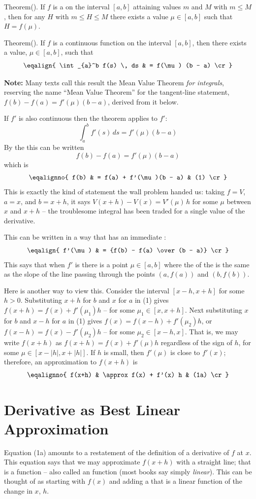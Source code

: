 \proclaim Theorem(). If $f$ is a  on the interval $[a, b]$ attaining values
$m$ and $M$ with $m \le M$, then for any  $H$ with $m \le H \le M$ 
there exists a value $\mu \in [a,b]$ such that $H = f(\mu)$.

\proclaim Theorem(). If $f$ is a continuous function on the interval $[a,b]$,
then there exists a value, $\mu \in [a,b]$, such that
$$
\eqalign{
\int_{a}^b f(s) \, ds & = f(\mu) (b - a) \cr
}
$$

{\bf Note:\/} Many texts call this result the Mean Value Theorem {\it for
integrals\/}, reserving the name ``Mean Value Theorem'' for the tangent-line
statement, $f(b) - f(a) = f'(\mu)(b - a)$, derived from it below.

If $f'$ is also continuous then the theorem applies to $f'$:
$$
\int_a^b f'(s) \, ds = f'(\mu) (b - a)
$$
By the  this can be written
$$
f(b) - f(a) = f'(\mu)(b - a)
$$
which is
$$
\eqalignno{
f(b) & = f(a) + f'(\mu)(b - a) & (1) \cr
}
$$
This is exactly the kind of statement the wall problem handed us: taking
$f = V$, $a = x$, and $b = x + h$, it says
$V(x+h) - V(x) = V'(\mu)\, h$ for some $\mu$ between $x$ and $x+h$ -- the
troublesome integral has been traded for a single value of the derivative.

This can be written in a way that has an immediate :
$$
\eqalign{
f'(\mu) & = {f(b) - f(a) \over (b - a)}  \cr
}
$$
This says that when $f'$ is  there is a point $\mu \in [a,b]$ where the  of the 
 is the same as the slope 
of the line passing through the points $(a, f(a))$ and $(b, f(b))$.

Here is another way to view this. Consider the interval $[x-h, x+h]$ for some $h>0$.  Substituting $x+h$ for $b$ and $x$ for $a$ in (1) gives
$f(x+h) = f(x) + f'(\mu_1)h$ -- for some $\mu_1 \in [x, x+h]$. Next substituting $x$ for $b$ and $x-h$ for $a$ in (1) gives
$f(x) = f(x-h) + f'(\mu_2) h$, or $f(x-h) = f(x) - f'(\mu_2)h$ -- for some $\mu_2 \in [x-h,x]$. That is, we may write $f(x+h)$ as
$f(x+h) = f(x) + f'(\mu)h$ regardless of the sign of $h$, for some $\mu \in [x-|h|, x+|h|]$.
If $h$ is small, then $f'(\mu)$ is close to $f'(x)$; therefore, an approximation to $f(x+h)$ is
$$
\eqalignno{
f(x+h) & \approx f(x) + f'(x) h & (1a) \cr
}
$$

\section{Derivative as Best Linear Approximation}
Equation (1a) amounts to a restatement of the definition of a derivative of $f$ at $x$.
This equation says that we may approximate $f(x+h)$ with a straight line; that is
a {\it {}\/} function -- also called an {\it {}\/} function
(most books say simply {\it linear\/}).
This can be thought of as starting with $f(x)$ and adding a {\it {}}
that is a linear function of the change in $x$, $h$.


